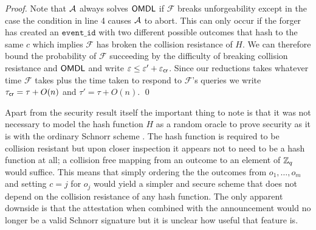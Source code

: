 \documentclass[runningheads]{llncs}
\newcommand{\eventid}{\mathtt{event\_id}}
\newcommand{\F}{\mathcal{F}}
\begin{document}
\begin{proof}
    Note that $\mathcal{A}$ always solves $\mathsf{OMDL}$ if $\F$ breaks unforgeability except in the case the condition in line 4 causes $\mathcal{A}$ to abort.
    This can only occur if the forger has created an $\eventid$ with two different possible outcomes that hash to the same $c$ which implies $\F$ has broken the collision resistance of $H$.
    We can therefore bound the probability of $\F$ succeeding by the difficulty of breaking collision resistance and $\mathsf{OMDL}$ and write $\varepsilon \leq \varepsilon' + \varepsilon_{\mathsf{cr}}$.
    Since our reductions takes whatever time $\F$ takes plus the time taken to respond to $\F$'s queries we write $\tau_{\mathsf{cr}} = \tau + O(n)$ and $\tau' = \tau + O(n)$.
\qed
\end{proof}


Apart from the security result itself the important thing to note is that it was not necessary to model the hash function $H$ as a random oracle to prove security as it is with the ordinary Schnorr scheme \cite{pointcheval2000security}.
The hash function is required to be collision resistant but upon closer inspection it appears not to need to be a hash function at all; a collision free mapping from an outcome to an element of $\mathbb{Z}_q$ would suffice.
This means that simply ordering the the outcomes from $o_{1},\ldots,o_{m}$ and setting $c = j$ for $o_{j}$ would yield a simpler and secure scheme that does not depend on the collision resistance of any hash function.
The only apparent downside is that the attestation when combined with the announcement would no longer be a valid Schnorr signature but it is unclear how useful that feature is.

{}

\end{document}
